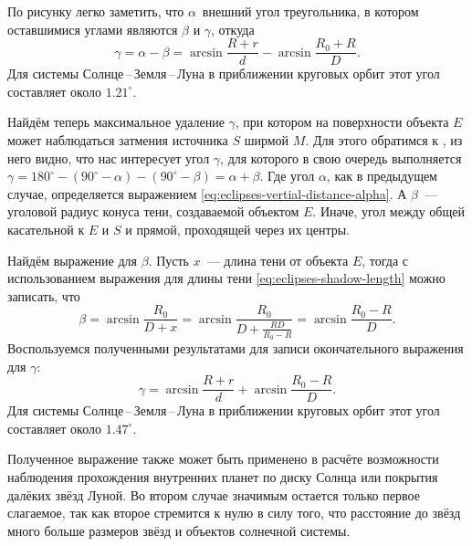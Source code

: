 По рисунку легко заметить, что $\alpha$~внешний угол треугольника, в котором оставшимися углами являются $\beta$ и $\gamma$, откуда
\begin{equation}
    \gamma = \alpha - \beta = \arcsin \frac{R + r}{d} - \arcsin \frac{R_0 + R}{D}.
\end{equation}
Для системы Солнце\,--\,Земля\,--\,Луна в приближении круговых орбит этот угол составляет около $1.21^\circ$.

\begin{figure}[h!]
    \centering
    
    \caption{}
    \label{pic:partial-eclipse-vertical-distance}
\end{figure}

Найдём теперь максимальное удаление $\gamma$, при котором на поверхности объекта $E$ может наблюдаться  затмения источника $S$ ширмой $M$. Для этого обратимся к , из него видно, что нас интересует угол $\gamma$, для которого в свою очередь выполняется $\gamma = 180^\circ - (90^\circ - \alpha) - (90^\circ - \beta) = \alpha + \beta$. Где угол $\alpha$, как в предыдущем случае, определяется выражением \eqref{eq:eclipses-vertial-distance-alpha}. А $\beta$~--- уголовой радиус конуса тени, создаваемой объектом $E$. Иначе, угол между общей касательной к $E$ и $S$ и прямой, проходящей через их центры.

Найдём выражение для $\beta$. Пусть $x$~--- длина тени от объекта $E$, тогда с использованием выражения для длины тени \eqref{eq:eclipses-shadow-length} можно записать, что 
\begin{equation*}
    \beta = \arcsin \frac{R_0}{D + x} = \arcsin \frac{R_0}{D + \frac{RD}{R_0 - R}} = \arcsin\frac{R_0 - R}{D}.
\end{equation*}
Воспользуемся полученными результатами для записи окончательного выражения для $\gamma$:
\begin{equation*}
    \gamma = \arcsin \frac{R + r}{d} + \arcsin\frac{R_0 - R}{D}.
\end{equation*}
Для системы Солнце\,--\,Земля\,--\,Луна в приближении круговых орбит этот угол составляет около $1.47^\circ$. 

Полученное выражение также может быть применено в расчёте возможности наблюдения прохождения внутренних планет по диску Солнца или покрытия далёких звёзд Луной. Во втором случае значимым остается только первое слагаемое, так как второе стремится к нулю в силу того, что расстояние до звёзд много больше размеров звёзд и объектов солнечной системы.

